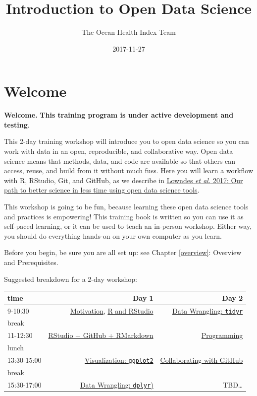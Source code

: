 \documentclass[]{book}
\title{Introduction to Open Data Science}
\author{The Ocean Health Index Team}
\date{2017-11-27}
\theoremstyle{definition}
\theoremstyle{definition}
\theoremstyle{definition}
\theoremstyle{remark}
\begin{document}
\maketitle

{
\setcounter{tocdepth}{1}
\tableofcontents
}
\chapter{Welcome}\label{welcome}

\textbf{Welcome.} \textbf{This training program is under active
development and testing}.

This 2-day training workshop will introduce you to open data science so
you can work with data in an open, reproducible, and collaborative way.
Open data science means that methods, data, and code are available so
that others can access, reuse, and build from it without much fuss. Here
you will learn a workflow with R, RStudio, Git, and GitHub, as we
describe in
\href{https://www.nature.com/articles/s41559-017-0160}{Lowndes \emph{et
al.} 2017: Our path to better science in less time using open data
science tools}.

This workshop is going to be fun, because learning these open data
science tools and practices is empowering! This training book is written
so you can use it as self-paced learning, or it can be used to teach an
in-person workshop. Either way, you should do everything hands-on on
your own computer as you learn.

Before you begin, be sure you are all set up: see Chapter
\ref{overview}: Overview and Prerequisites.

Suggested breakdown for a 2-day workshop:

\begin{longtable}[]{@{}lrr@{}}
\toprule
time & Day 1 & Day 2\tabularnewline
\midrule
\endhead
9-10:30 & \protect\hyperlink{overview}{Motivation},
\protect\hyperlink{rstudio}{R and RStudio} &
\protect\hyperlink{tidyr}{Data Wrangling: \texttt{tidyr}}\tabularnewline
break & &\tabularnewline
11-12:30 & \protect\hyperlink{github}{RStudio + GitHub + RMarkdown} &
\protect\hyperlink{programming}{Programming}\tabularnewline
lunch & &\tabularnewline
13:30-15:00 & \protect\hyperlink{viz}{Visualization: \texttt{ggplot2}} &
\protect\hyperlink{collaborating}{Collaborating with
GitHub}\tabularnewline
break & &\tabularnewline
15:30-17:00 & \protect\hyperlink{dplyr}{Data Wrangling: \texttt{dplyr})}
& TBD\ldots{}\tabularnewline
\bottomrule
\end{longtable}
\end{document}
